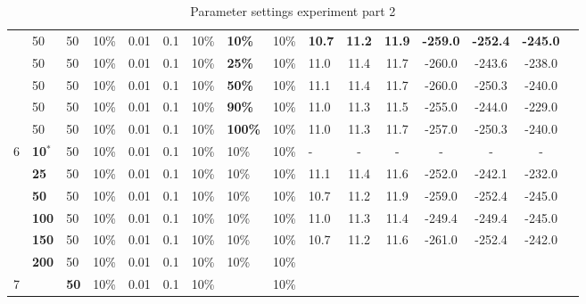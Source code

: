 \begin{sidewaystable}
\begin{tabular}{|l|l|l|l|l|l|l|l|l|l||c|c|c|c|c|c|}
    ~ & 50 & 50 & 10\% & 0.01 & 0.1 & 10\% & \textbf{10\%} & 10\% & \textbf{10.7} & \textbf{11.2} & \textbf{11.9} & \textbf{-259.0} & \textbf{-252.4} & \textbf{-245.0} \\
    ~ & 50 & 50 & 10\% & 0.01 & 0.1 & 10\% & \textbf{25\%} & 10\% & 11.0 & 11.4 & 11.7 & -260.0 & -243.6 & -238.0 \\
    ~ & 50 & 50 & 10\% & 0.01 & 0.1 & 10\% & \textbf{50\%} & 10\% & 11.1 & 11.4 & 11.7 & -260.0 & -250.3 & -240.0 \\
    ~ & 50 & 50 & 10\% & 0.01 & 0.1 & 10\% & \textbf{90\%} & 10\% & 11.0 & 11.3 & 11.5 & -255.0 & -244.0 & -229.0 \\
    ~ & 50 & 50 & 10\% & 0.01 & 0.1 & 10\% & \textbf{100\%} & 10\% & 11.0 & 11.3 & 11.7 & -257.0 & -250.3 & -240.0 \\

    \hline
    6 & \textbf{10$^*$} & 50 & 10\% & 0.01 & 0.1 & 10\% & 10\% & 10\% & - & - & - & - & - & - \\
    ~ & \textbf{25} & 50 & 10\% & 0.01 & 0.1 & 10\% & 10\% & 10\% & 11.1 & 11.4 & 11.6 & -252.0 & -242.1 & -232.0 \\
    ~ & \textbf{50} & 50 & 10\% & 0.01 & 0.1 & 10\% & 10\% & 10\% & 10.7 & 11.2 & 11.9 & -259.0 & -252.4 & -245.0 \\
    ~ & \textbf{100} & 50 & 10\% & 0.01 & 0.1 & 10\% & 10\% & 10\% & 11.0 & 11.3 & 11.4 & -249.4 & -249.4 & -245.0 \\
    ~ & \textbf{150} & 50 & 10\% & 0.01 & 0.1 & 10\% & 10\% & 10\% & 10.7 & 11.2 & 11.6 & -261.0 & -252.4 & -242.0 \\
    ~ & \textbf{200} & 50 & 10\% & 0.01 & 0.1 & 10\% & 10\% & 10\% & ~ & ~ & ~ & ~ & ~ & ~ \\
    \hline
    7 & ~ & \textbf{50} & 10\% & 0.01 & 0.1 & 10\% & ~ & 10\% & ~ & ~ & ~ & ~ & ~ & ~  \\
    \hline
    \end{tabular}
    \caption {Parameter settings experiment part 2}
    \label{table:pm2}
\end{sidewaystable}

